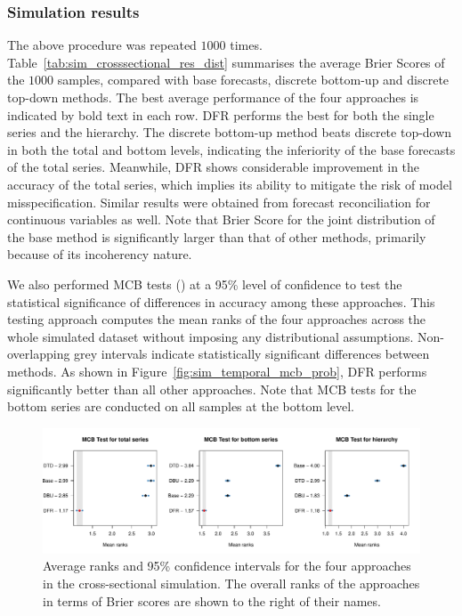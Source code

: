 \documentclass[a4paper,review,12pt,authoryear]{elsarticle}
\theoremstyle{definition}
\begin{document}
    \subsubsection{Simulation results}
    The above procedure was repeated $1000$ times.
    Table~\ref{tab:sim_crosssectional_res_dist} summarises the average Brier Scores of the $1000$ samples, compared with base forecasts, discrete bottom-up and discrete top-down methods.
    The best average performance of the four approaches is indicated by bold text in each row.
    DFR performs the best for both the single series and the hierarchy.
    The discrete bottom-up method beats discrete top-down in both the total and bottom levels, indicating the inferiority of the base forecasts of the total series.
    Meanwhile, DFR shows considerable improvement in the accuracy of the total series, which implies its ability to mitigate the risk of model misspecification.
    Similar results were obtained from forecast reconciliation for continuous variables as well.
    Note that Brier Score for the joint distribution of the base method is significantly larger than that of other methods, primarily because of its incoherency nature.

    We also performed MCB tests (\citealp{koningM3CompetitionStatistical2005}) at a 95\% level of confidence to test the statistical significance of differences in accuracy among these approaches.
    This testing approach computes the mean ranks of the four approaches across the whole simulated dataset without imposing any distributional assumptions.
    Non-overlapping grey intervals indicate statistically significant differences between methods.
    As shown in Figure~\ref{fig:sim_temporal_mcb_prob}, DFR performs significantly better than all other approaches.
    Note that MCB tests for the bottom series are conducted on all samples at the bottom level.

    \begin{figure}
      \centering
      \label{fig:mcb_crosssectional}
      \caption{Average ranks and 95\% confidence intervals for the four approaches in the cross-sectional simulation. The overall ranks of the approaches in terms of Brier scores are shown to the right of their names.}
      \includegraphics[width=\textwidth]{figures/cross_sectional_mcb.pdf}
    \end{figure}
\end{document}
